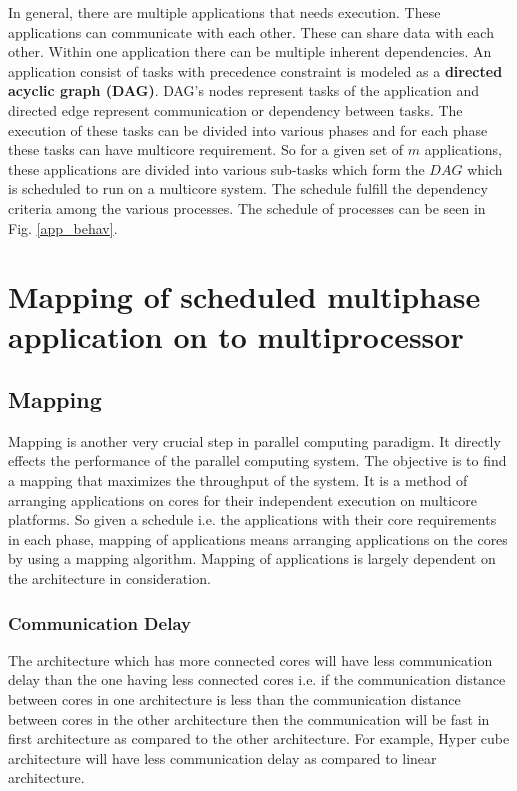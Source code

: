 \documentclass[10pt, conference]{IEEEtran}
\begin{document}
In general, there are multiple applications that needs execution. These applications can communicate with each other. These can share data with each other. Within one application there can be multiple inherent dependencies. An application consist of tasks with precedence constraint is modeled as a {\bf directed acyclic graph (DAG)}. DAG's nodes represent tasks of the application and directed edge represent communication or dependency between tasks. The execution of these tasks can be divided into various phases and for each phase these tasks can have multicore requirement. So for a given set of $m$ applications, these applications are divided into various sub-tasks which form the $DAG$ which is scheduled to run on a multicore system. The schedule fulfill the dependency criteria among the various processes. The schedule of processes can be seen in Fig. \ref{app_behav}. 
\section{Mapping of scheduled multiphase application on to multiprocessor}
\subsection{Mapping}
Mapping is another very crucial step in parallel computing paradigm. It directly effects the performance of the parallel computing system.
The objective is to find a mapping that maximizes the throughput of the system. It is a method of arranging applications on cores for their independent execution on multicore platforms. So given a schedule i.e. the applications with their core requirements in each phase, mapping of applications means arranging applications on the cores by using a mapping algorithm. Mapping of applications is largely dependent on the architecture in consideration.

\subsubsection{Communication Delay}
The architecture which has more connected cores will have less communication delay than the one having less connected cores i.e. if the communication distance between cores in one architecture is less than the communication distance between cores in the other architecture then the communication will be fast in first architecture as compared to the other architecture.
For example, Hyper cube architecture will have less communication delay as compared to linear architecture.
\end{document}
